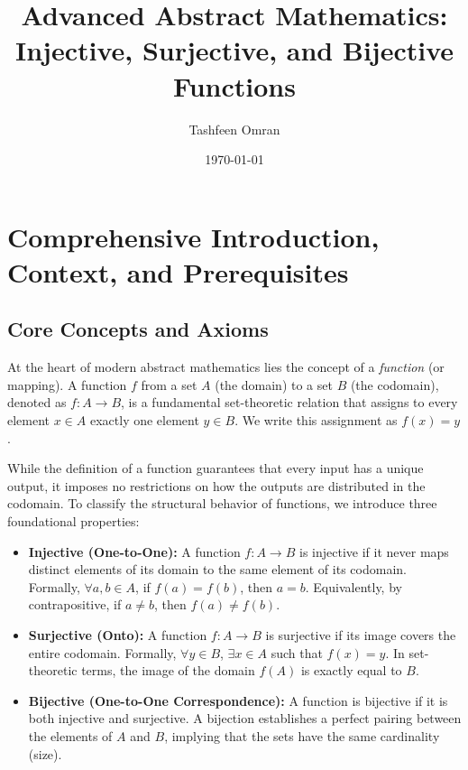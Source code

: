 \documentclass[11pt, a4paper]{article}
\title{\textbf{Advanced Abstract Mathematics: Injective, Surjective, and Bijective Functions}}
\author{Tashfeen Omran}
\date{\today}
\theoremstyle{definition}
\theoremstyle{remark}
\begin{document}
\maketitle
\tableofcontents
\newpage

\section{Comprehensive Introduction, Context, and Prerequisites}

\subsection{Core Concepts and Axioms}
At the heart of modern abstract mathematics lies the concept of a \textit{function} (or mapping). A function $f$ from a set $A$ (the domain) to a set $B$ (the codomain), denoted as $f: A \to B$, is a fundamental set-theoretic relation that assigns to every element $x \in A$ exactly one element $y \in B$. We write this assignment as $f(x) = y$. 

While the definition of a function guarantees that every input has a unique output, it imposes no restrictions on how the outputs are distributed in the codomain. To classify the structural behavior of functions, we introduce three foundational properties:
\begin{itemize}
    \item \textbf{Injective (One-to-One):} A function $f: A \to B$ is injective if it never maps distinct elements of its domain to the same element of its codomain. Formally, $\forall a, b \in A$, if $f(a) = f(b)$, then $a = b$. Equivalently, by contrapositive, if $a \neq b$, then $f(a) \neq f(b)$.
    \item \textbf{Surjective (Onto):} A function $f: A \to B$ is surjective if its image covers the entire codomain. Formally, $\forall y \in B$, $\exists x \in A$ such that $f(x) = y$. In set-theoretic terms, the image of the domain $f(A)$ is exactly equal to $B$.
    \item \textbf{Bijective (One-to-One Correspondence):} A function is bijective if it is both injective and surjective. A bijection establishes a perfect pairing between the elements of $A$ and $B$, implying that the sets have the same cardinality (size).
\end{itemize}
\end{document}
